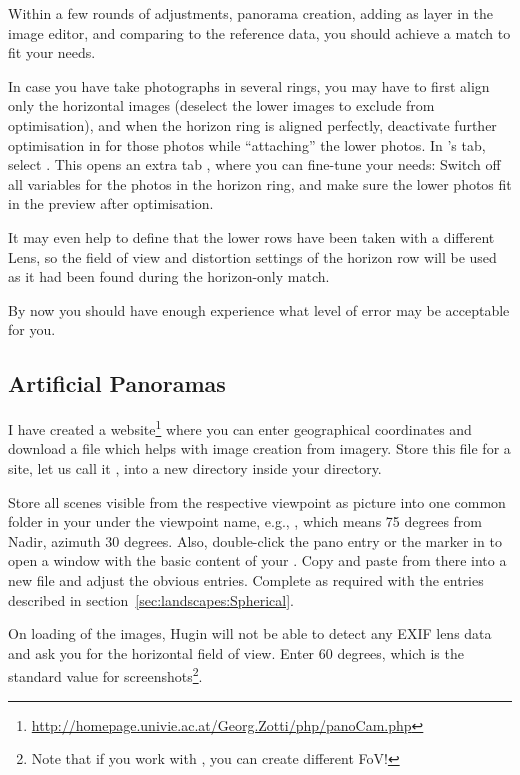 Within a few rounds of adjustments, panorama creation, adding as layer
in the image editor, and comparing to the reference data, you should
achieve a match to fit your needs.

In case you have take photographs in several rings, you may have to
first align only the horizontal images (deselect the lower images to
exclude from optimisation), and when the horizon ring is aligned
perfectly, deactivate further optimisation in  for those photos
while ``attaching'' the lower photos. In 's  tab,
select . This opens an
extra tab , where you can fine-tune your needs: Switch
off all variables for the photos in the horizon ring, and make sure
the lower photos fit in the preview after optimisation.

It may even help to define that the lower rows have been taken with a
different Lens, so the field of view and distortion settings of the
horizon row will be used as it had been found during the horizon-only
match.

By now you should have
enough experience what level of error may be acceptable for you.


\subsection{Artificial Panoramas}
\label{sec:landscapes:Artificial}

I have created a
website\footnote{\url{http://homepage.univie.ac.at/Georg.Zotti/php/panoCam.php}} where
you can enter geographical coordinates and download a file
  which helps with image creation from 
imagery. Store this file for a site, let us call it
, into a new directory  inside
your  directory.

Store all scenes visible from the respective viewpoint
 as picture into one common folder in your
 under the viewpoint name, e.g.,
, which means 75 degrees from Nadir, azimuth 30
degrees.  Also, double-click the pano entry or the marker in  to open a window with the
basic content of your . Copy and paste from there
into a new file  and adjust the obvious
entries. Complete as required with the entries described in
section~\ref{sec:landscapes:Spherical}.

On loading of the images, Hugin will not be able to detect any EXIF
lens data and ask you for the horizontal field of view. Enter 60
degrees, which is the standard value for 
screenshots\footnote{Note that if you work with , you
  can create different FoV!}.

